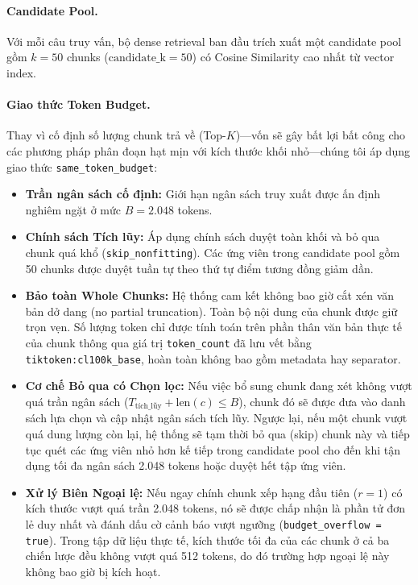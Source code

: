 \paragraph{Candidate Pool.}
Với mỗi câu truy vấn, bộ dense retrieval ban đầu trích xuất một candidate pool gồm $k = 50$ chunks ($\text{candidate\_k} = 50$) có Cosine Similarity cao nhất từ vector index.

\paragraph{Giao thức Token Budget.}
Thay vì cố định số lượng chunk trả về (Top-$K$)---vốn sẽ gây bất lợi bất công cho các phương pháp phân đoạn hạt mịn với kích thước khối nhỏ---chúng tôi áp dụng giao thức \texttt{same\_token\_budget}:
\begin{itemize}
    \item \textbf{Trần ngân sách cố định:} Giới hạn ngân sách truy xuất được ấn định nghiêm ngặt ở mức $B = 2.048$ tokens.
    \item \textbf{Chính sách Tích lũy:} Áp dụng chính sách duyệt toàn khối và bỏ qua chunk quá khổ (\texttt{skip\_nonfitting}). Các ứng viên trong candidate pool gồm 50 chunks được duyệt tuần tự theo thứ tự điểm tương đồng giảm dần.
    \item \textbf{Bảo toàn Whole Chunks:} Hệ thống cam kết không bao giờ cắt xén văn bản dở dang (no partial truncation). Toàn bộ nội dung của chunk được giữ trọn vẹn. Số lượng token chỉ được tính toán trên phần thân văn bản thực tế của chunk thông qua giá trị \texttt{token\_count} đã lưu vết bằng \texttt{tiktoken:cl100k\_base}, hoàn toàn không bao gồm metadata hay separator.
    \item \textbf{Cơ chế Bỏ qua có Chọn lọc:} Nếu việc bổ sung chunk đang xét không vượt quá trần ngân sách ($T_{\text{tích\_lũy}} + \text{len}(c) \le B$), chunk đó sẽ được đưa vào danh sách lựa chọn và cập nhật ngân sách tích lũy. Ngược lại, nếu một chunk vượt quá dung lượng còn lại, hệ thống sẽ tạm thời bỏ qua (skip) chunk này và tiếp tục quét các ứng viên nhỏ hơn kế tiếp trong candidate pool cho đến khi tận dụng tối đa ngân sách 2.048 tokens hoặc duyệt hết tập ứng viên.
    \item \textbf{Xử lý Biên Ngoại lệ:} Nếu ngay chính chunk xếp hạng đầu tiên ($r=1$) có kích thước vượt quá trần 2.048 tokens, nó sẽ được chấp nhận là phần tử đơn lẻ duy nhất và đánh dấu cờ cảnh báo vượt ngưỡng (\texttt{budget\_overflow = true}). Trong tập dữ liệu thực tế, kích thước tối đa của các chunk ở cả ba chiến lược đều không vượt quá 512 tokens, do đó trường hợp ngoại lệ này không bao giờ bị kích hoạt.
\end{itemize}

